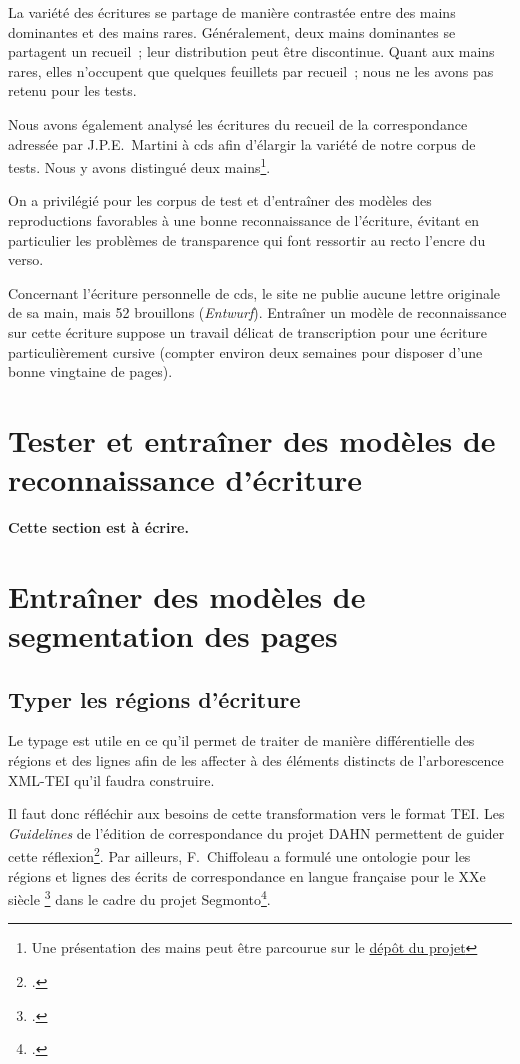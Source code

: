 \documentclass[a4paper,12pt,twoside]{book}
\begin{document}
			La variété des écritures se partage de manière contrastée entre des mains dominantes et des mains rares. Généralement, deux mains dominantes se partagent un recueil~; leur distribution peut être discontinue. Quant aux mains rares, elles n'occupent que quelques feuillets par recueil~; nous ne les avons pas retenu pour les tests.
			
			Nous avons également analysé les écritures du recueil de la correspondance adressée par J.P.E.~Martini à \gls{cds} afin d'élargir la variété de notre corpus de tests. Nous y avons distingué deux mains\footnote{Une présentation des mains peut être parcourue sur le \href{https://github.com/sbiay/CdS-edition/tree/main/htr/sources}{dépôt du projet}}.
			
			On a privilégié pour les corpus de test et d'entraîner des modèles des reproductions favorables à une bonne reconnaissance de l'écriture, évitant en particulier les problèmes de transparence qui font ressortir au recto l'encre du verso.
					
			Concernant l'écriture personnelle de \gls{cds}, le site ne publie aucune lettre originale de sa main, mais 52 brouillons (\textit{Entwurf}). Entraîner un modèle de reconnaissance sur cette écriture suppose un travail délicat de transcription pour une écriture particulièrement cursive (compter environ deux semaines pour disposer d'une bonne vingtaine de pages).
		
		\section{Tester et entraîner des modèles de reconnaissance d'écriture}
			\textbf{Cette section est à écrire.}
		
		\section{Entraîner des modèles de segmentation des pages}
       
            \subsection{Typer les régions d'écriture}
            Le typage est utile en ce qu'il permet de traiter de manière différentielle des régions et des lignes afin de les affecter à des éléments distincts de l'arborescence XML-TEI qu'il faudra construire.
            
            Il faut donc réfléchir aux besoins de cette transformation vers le format TEI. Les \textit{Guidelines} de l'édition de correspondance du projet DAHN permettent de guider cette réflexion\footcite{chiffoleauCorrespondenceGuidelines2022}. Par ailleurs, F.~Chiffoleau a formulé une ontologie pour les régions et lignes des écrits de correspondance en langue française pour le XXe siècle \footcite{chiffoleauCorrespondanceLangueFrancaise2021} dans le cadre du projet \gls{Segmonto}\footcite{gabaySegmOntoCommonVocabulary2021}.
			
\end{document}
